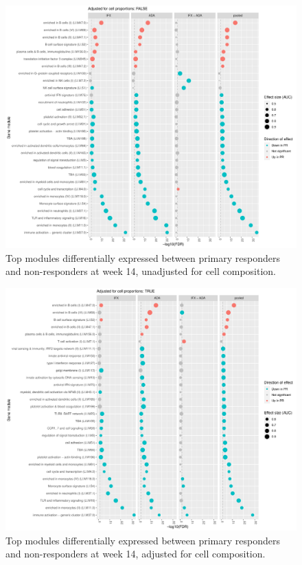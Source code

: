 \begin{figure}
    \centering
    \includegraphics[width=1.0\textwidth,page=1]{mainmatter/figures/chapter_04/plot_gene_set_enrichment.tmodCERNO_panelplot_reversed_C_3RI_3NI,C_3RA_3NA,C_(3RI_3NI)_(3RA_3NA),C_3R_3N.cell_prop_correction_FALSE.pdf}
    \caption{Top modules differentially expressed between primary responders and non-responders at week 14, unadjusted for cell composition.}
    \label{fig:multipants_dge_panelPlot_week_14_R_N_cellPropF}
\end{figure}

\begin{figure}
    \centering
    \includegraphics[width=1.0\textwidth,page=1]{mainmatter/figures/chapter_04/plot_gene_set_enrichment.tmodCERNO_panelplot_reversed_C_3RI_3NI,C_3RA_3NA,C_(3RI_3NI)_(3RA_3NA),C_3R_3N.cell_prop_correction_TRUE.pdf}
    \caption{Top modules differentially expressed between primary responders and non-responders at week 14, adjusted for cell composition.}
    \label{fig:multipants_dge_panelPlot_week_14_R_N_cellPropT}
\end{figure}

